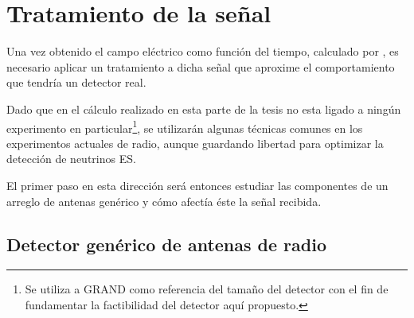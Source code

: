 \section{Tratamiento de la se\~nal}
\label{sbsc:sig_treat}
	
	Una vez obtenido el campo el\'ectrico como funci\'on del tiempo, calculado por \zhs{}, es necesario aplicar un tratamiento a dicha se\~nal que aproxime el comportamiento que tendr\'ia un detector real.
	
	Dado que en el c\'alculo realizado en esta parte de la tesis no esta ligado a ning\'un experimento en particular\footnote{Se utiliza a GRAND como referencia del tama\~no del detector con el fin de fundamentar la factibilidad del detector aqu\'i propuesto.}, se utilizar\'an algunas t\'ecnicas comunes en los experimentos actuales de radio, aunque guardando libertad para optimizar la detecci\'on de neutrinos ES.
	
	El primer paso en esta direcci\'on ser\'a entonces estudiar las componentes de un arreglo de antenas gen\'erico y c\'omo afect\'ia \'este la se\~nal recibida.
	
	\subsection{Detector gen\'erico de antenas de radio}
	

